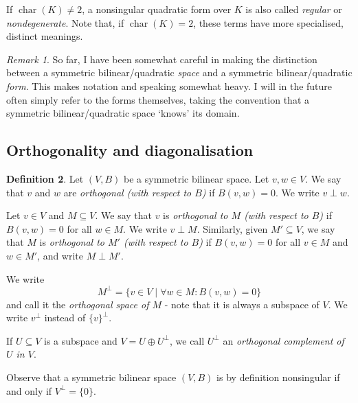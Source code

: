 \documentclass[12pt, leqno, british]{amsart}
\theoremstyle{definition}
\newtheorem{defi}{Definition}[subsection]
\theoremstyle{plain}
\theoremstyle{remark}
\newtheorem{rem}[defi]{Remark}
\DeclareMathOperator{\charac}{char}
\begin{document}
If $\charac(K) \neq 2$, a nonsingular quadratic form over $K$ is also called \emph{regular} or \emph{nondegenerate}.
Note that, if $\charac(K) = 2$, these terms have more specialised, distinct meanings.

\begin{rem}
So far, I have been somewhat careful in making the distinction between a symmetric bilinear/quadratic \textit{space} and a symmetric bilinear/quadratic \textit{form}.
This makes notation and speaking somewhat heavy. I will in the future often simply refer to the forms themselves, taking the convention that a symmetric bilinear/quadratic space `knows' its domain.
\end{rem}

\subsection{Orthogonality and diagonalisation}
\begin{defi}
Let $(V, B)$ be a symmetric bilinear space.
Let $v, w \in V$.
We say that $v$ and $w$ are \emph{orthogonal (with respect to $B$)} if $B(v, w) = 0$.
We write $v \perp w$.

Let $v \in V$ and $M \subseteq V$.
We say that $v$ is \emph{orthogonal to $M$ (with respect to $B$)} if $B(v, w) = 0$ for all $w \in M$.
We write $v \perp M$.
Similarly, given $M' \subseteq V$, we say that $M$ is \emph{orthogonal to $M'$ (with respect to $B$)} if $B(v, w) = 0$ for all $v \in M$ and $w \in M'$, and write $M \perp M'$.

We write
$$ M^\perp = \lbrace v \in V \mid \forall w \in M : B(v, w) = 0 \rbrace$$
and call it the \emph{orthogonal space of $M$} - note that it is always a subspace of $V$. We write $v^\perp$ instead of $\lbrace v \rbrace^\perp$.

If $U \subseteq V$ is a subspace and $V = U \oplus U^\perp$, we call $U^\perp$ an \emph{orthogonal complement of $U$ in $V$}.
\end{defi}
Observe that a symmetric bilinear space $(V, B)$ is by definition nonsingular if and only if $V^\perp = \lbrace 0 \rbrace$.
\end{document}
